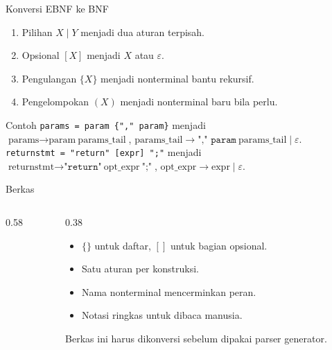 \documentclass[aspectratio=169,10pt,t]{beamer}
\begin{document}
\begin{frame}{Konversi EBNF ke BNF}
  \begin{enumerate}
    \setlength{\itemsep}{1pt}
    \item Pilihan \(X \mid Y\) menjadi dua aturan terpisah.
    \item Opsional \([X]\) menjadi \(X\) atau \(\varepsilon\).
    \item Pengulangan \(\{X\}\) menjadi nonterminal bantu rekursif.
    \item Pengelompokan \((X)\) menjadi nonterminal baru bila perlu.
  \end{enumerate}

  \vspace{3pt}
  \begin{block}{Contoh}
    \footnotesize
    \texttt{params = param \{"," param\}} menjadi\\
    \(\text{params} \to \text{param}\ \text{params\_tail}\),\quad
    \(\text{params\_tail} \to \texttt{"," param}\ \text{params\_tail}
     \mid \varepsilon\).\\[2pt]
    \texttt{returnstmt = "return" [expr] ";"} menjadi\\
    \(\text{returnstmt} \to \texttt{"return"}\ \text{opt\_expr}\
     \texttt{";"}\),\quad
    \(\text{opt\_expr} \to \text{expr} \mid \varepsilon\).
  \end{block}
\end{frame}

\begin{frame}[fragile]{Berkas \file{grammar.ebnf}}
  \begin{columns}[T,onlytextwidth]
    \begin{column}{0.58\textwidth}
      
    \end{column}
    \begin{column}{0.38\textwidth}
      \begin{itemize}
        \item \(\{\}\) untuk daftar, \([]\) untuk bagian opsional.
        \item Satu aturan per konstruksi.
        \item Nama nonterminal mencerminkan peran.
        \item Notasi ringkas untuk dibaca manusia.
      \end{itemize}
      \vspace{2pt}
      {\scriptsize\color{ubbblue!75}Berkas ini harus dikonversi sebelum
      dipakai parser generator.}
    \end{column}
  \end{columns}
\end{frame}
\end{document}
